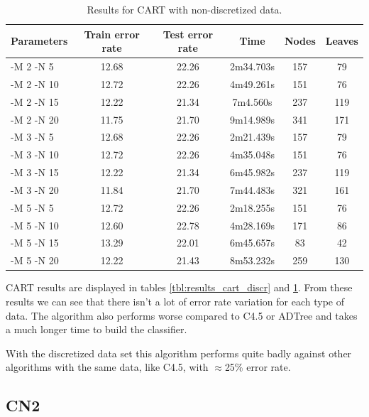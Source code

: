 \documentclass[a4paper]{llncs}
\begin{document}
\begin{table}[ht]
  \begin{center}
  \begin{tabular}{ | l | c | c | c | c | c |}
    \hline
    \textbf{Parameters} & \textbf{Train error rate} & \textbf{Test error rate} & \textbf{Time} & \textbf{Nodes} & \textbf{Leaves} \\ \hline
    -M 2 -N 5 & 12.68 & 22.26 & 2m34.703s & 157 & 79 \\ \hline
    -M 2 -N 10 & 12.72 & 22.26 & 4m49.261s & 151 & 76 \\ \hline
    -M 2 -N 15 & 12.22 & 21.34 & 7m4.560s & 237 & 119 \\ \hline
    -M 2 -N 20 & 11.75 & 21.70 & 9m14.989s & 341 & 171 \\ \hline
    
    -M 3 -N 5 & 12.68 & 22.26 & 2m21.439s & 157 & 79 \\ \hline
    -M 3 -N 10 & 12.72 & 22.26 & 4m35.048s & 151 & 76 \\ \hline
    -M 3 -N 15 & 12.22 & 21.34 & 6m45.982s & 237 & 119 \\ \hline
    -M 3 -N 20 & 11.84 & 21.70 & 7m44.483s & 321 & 161 \\ \hline
    
    -M 5 -N 5 & 12.72 & 22.26 & 2m18.255s & 151 & 76 \\ \hline
    -M 5 -N 10 & 12.60 & 22.78 & 4m28.169s & 171 & 86 \\ \hline
    -M 5 -N 15 & 13.29 & 22.01 & 6m45.657s & 83 & 42 \\ \hline
    -M 5 -N 20 & 12.22 & 21.43 & 8m53.232s & 259 & 130 \\ \hline
  \end{tabular}
  \caption{Results for CART with non-discretized data.}
  \label{tbl:results_cart_raw}
  \end{center}
\end{table}

CART results are displayed in tables \ref{tbl:results_cart_discr} and
\ref{tbl:results_cart_raw}.
From these results we can see that there isn't a lot of error rate variation
for each type of data.
The algorithm also performs worse compared to C4.5 or ADTree
and takes a much longer time to build the classifier.

With the discretized data set this algorithm performs quite badly
against other algorithms with the same data, like C4.5, with $\approx$25\% error rate.

\subsection{CN2}
\end{document}
